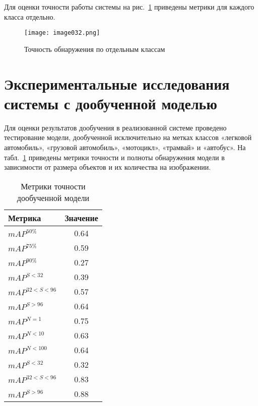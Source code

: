 Для оценки точности работы системы на рис.~\ref{fig:image032} приведены метрики для каждого класса отдельно.

\begin{figure}[htbp]
\centering
\texttt{[image: image032.png]}
\caption{Точность обнаружения по отдельным классам}%
\label{fig:image032}
\end{figure}

\section{Экспериментальные исследования системы с дообученной моделью}

Для оценки результатов дообучения в реализованной системе проведено тестирование модели, дообученной исключительно на метках классов «легковой автомобиль», «грузовой автомобиль», «мотоцикл», «трамвай» и «автобус». На табл.~\ref{tabular:tab_exp_2} приведены метрики точности и полноты обнаружения модели в зависимости от размера объектов и их количества на изображении.

\begin{table}[H]
	\def\arraystretch{1.3}
	\caption{Метрики точности дообученной модели}
	\begin{center}
		\begin{tabular}{|l|c|}
			\hline
			Метрика & Значение\\  \hline			
			\(mAP^{50\%}\) & 0.64\\ \hline			
			\(mAP^{75\%}\) & 0.59\\ \hline
			\(mAP^{90\%}\) & 0.27\\ \hline
			\(mAP^{S<32}\) & 0.39\\ \hline
			\(mAP^{32<S<96}\) & 0.57\\ \hline
			\(mAP^{S>96}\) & 0.64\\ \hline
			\(mAP^{N=1}\) & 0.75\\ \hline
			\(mAP^{N<10}\) & 0.63\\ \hline
			\(mAP^{N<100}\) & 0.64\\ \hline
			\(mAP^{S<32}\) & 0.32\\ \hline
			\(mAP^{32<S<96}\) & 0.83\\ \hline
			\(mAP^{S>96}\) & 0.88\\ \hline			
		\end{tabular}
		\label{tabular:tab_exp_2}
	\end{center}
\end{table}

